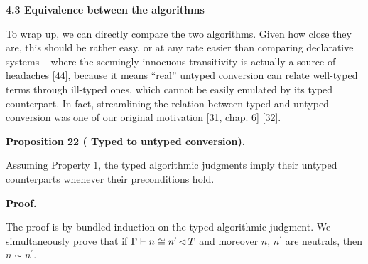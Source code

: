  
 


 
\par\medskip\noindent\textbf{4.3 Equivalence between the algorithms}\par
 
 
To wrap up, we can directly compare the two algorithms. Given how close they are, this should be rather easy, or at any rate easier than comparing declarative systems – where the seemingly innocuous transitivity is actually a source of headaches [44], because it means “real” untyped conversion can relate well-typed terms through ill-typed ones, which cannot be easily emulated by its typed counterpart. In fact, streamlining the relation between typed and untyped conversion was one of our original motivation [31, chap. 6] [32].\par
 
 
 
\par\medskip\noindent\textbf{Proposition 22 (  Typed to untyped conversion).}\par
 
 
Assuming Property 1, the typed algorithmic judgments imply their untyped counterparts whenever their preconditions hold.\par
 
 
 
 
\par\medskip\noindent\textbf{Proof.}\par
 
 
The proof is by bundled induction on the typed algorithmic judgment. We simultaneously prove that if $\Gamma\vdash n\mathrel{\raisebox{-0.5pt}{$\cong$}}n^{\prime}\operatorname{%
\mathrel{\lhd}}T$ and moreover $n$, $n^{\prime}$ are neutrals, then $n\sim n^{\prime}$.\par
 
 
 

